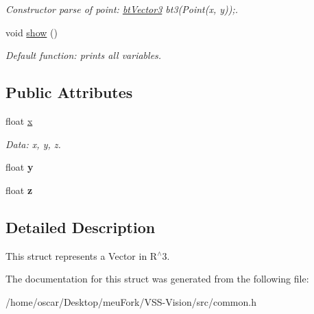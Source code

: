 \begin{DoxyCompactItemize}
\begin{DoxyCompactList}\small\item\em Constructor parse of point\-: \hyperlink{structcommon_1_1btVector3}{bt\-Vector3} bt3(\-Point(x, y));. \end{DoxyCompactList}\item 
\hypertarget{structcommon_1_1btVector3_ad182266905d95459f9ca03da9af47f35}{void \hyperlink{structcommon_1_1btVector3_ad182266905d95459f9ca03da9af47f35}{show} ()}\label{structcommon_1_1btVector3_ad182266905d95459f9ca03da9af47f35}

\begin{DoxyCompactList}\small\item\em Default function\-: prints all variables. \end{DoxyCompactList}\end{DoxyCompactItemize}
\subsection*{Public Attributes}
\begin{DoxyCompactItemize}
\item 
\hypertarget{structcommon_1_1btVector3_adbe23ed6ae54734cbdf7b37788e0c702}{float \hyperlink{structcommon_1_1btVector3_adbe23ed6ae54734cbdf7b37788e0c702}{x}}\label{structcommon_1_1btVector3_adbe23ed6ae54734cbdf7b37788e0c702}

\begin{DoxyCompactList}\small\item\em Data\-: x, y, z. \end{DoxyCompactList}\item 
\hypertarget{structcommon_1_1btVector3_a5b52b09733d198cde3d283c0b2b320d1}{float {\bfseries y}}\label{structcommon_1_1btVector3_a5b52b09733d198cde3d283c0b2b320d1}

\item 
\hypertarget{structcommon_1_1btVector3_aa03665d96dd5d3dd2dbaeb6e9f24f4bc}{float {\bfseries z}}\label{structcommon_1_1btVector3_aa03665d96dd5d3dd2dbaeb6e9f24f4bc}

\end{DoxyCompactItemize}


\subsection{Detailed Description}
This struct represents a Vector in R$^\wedge$3. 

The documentation for this struct was generated from the following file\-:\begin{DoxyCompactItemize}
\item 
/home/oscar/\-Desktop/meu\-Fork/\-V\-S\-S-\/\-Vision/src/common.\-h\end{DoxyCompactItemize}
